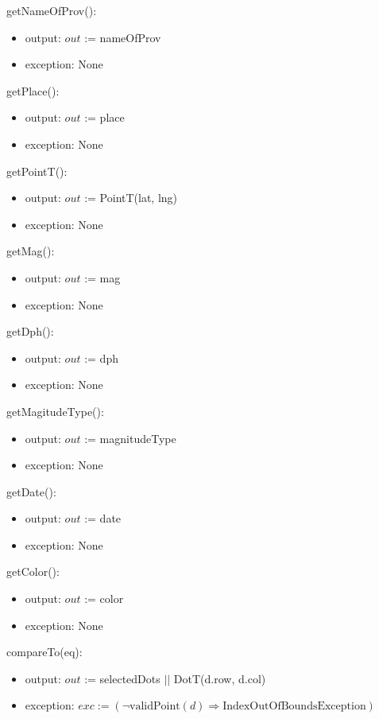 \documentclass[12pt]{article}
\begin{document}
\noindent getNameOfProv():
\begin{itemize}
\item output: $out$ := nameOfProv
\item exception: None
\end{itemize}

\noindent getPlace():
\begin{itemize}
\item output: $out$ := place
\item exception: None
\end{itemize}

\noindent getPointT():
\begin{itemize}
\item output: $out$ := PointT(lat, lng)
\item exception: None
\end{itemize}

\noindent getMag():
\begin{itemize}
\item output: $out$ := mag
\item exception: None
\end{itemize}

\noindent getDph():
\begin{itemize}
\item output: $out$ := dph
\item exception: None
\end{itemize}

\noindent getMagitudeType():
\begin{itemize}
\item output: $out$ := magnitudeType
\item exception: None
\end{itemize}

\noindent getDate():
\begin{itemize}
\item output: $out$ := date
\item exception: None
\end{itemize}

\noindent getColor():
\begin{itemize}
\item output: $out$ := color
\item exception: None
\end{itemize}

\noindent compareTo(eq):
\begin{itemize}
\item output: $out$ := selectedDots $||$ DotT(d.row, d.col)
\item exception: $exc := (\neg \mbox{validPoint}(d) \Rightarrow \mbox{IndexOutOfBoundsException})$
\end{itemize}
\end{document}
